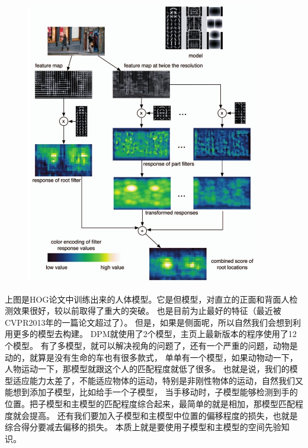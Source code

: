 \begin{figure}
\centering
\includegraphics[width=0.9\textwidth]{img/dpm.jpg}
\label{fig:dpm}
\end{figure}

上图是HOG论文中训练出来的人体模型。它是但模型，对直立的正面和背面人检测效果很好，较以前取得了重大的突破。
也是目前为止最好的特征（最近被CVPR2013年的一篇论文\cite{hsc}超过了）。
但是，如果是侧面呢，所以自然我们会想到利用更多的模型去构建。
DPM就使用了2个模型，主页上最新版本的程序使用了12个模型。
有了多模型，就可以解决视角的问题了，还有一个严重的问题，动物是动的，就算是没有生命的车也有很多款式，
单单有一个模型，如果动物动一下，人物运动一下，那模型就跟这个人的匹配程度就低了很多。
也就是说，我们的模型适应能力太差了，不能适应物体的运动，特别是非刚性物体的运动，自然我们又能想到添加子模型，比如给手一个子模型，
当手移动时，子模型能够检测到手的位置。把子模型和主模型的匹配程度综合起来，最简单的就是相加，那模型匹配程度就会提高。
还有我们要加入子模型和主模型中位置的偏移程度的损失，也就是综合得分要减去偏移的损失。
本质上就是要使用子模型和主模型的空间先验知识。



